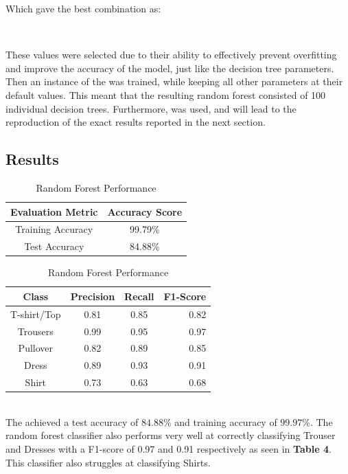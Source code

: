 Which gave the best combination as:\\

\begin{tcolorbox}[colback=white,
                  arc=0pt,
                outer=0pt]
\centering {} \, \,  \, \,  \, \, \\
   \end{tcolorbox}


These values were selected due to their ability to effectively prevent overfitting and improve the accuracy of the model, just like the decision tree parameters.
Then an instance of the  was trained, while keeping all other parameters at their default values.
This meant that the resulting random forest consisted of 100 individual decision trees.
Furthermore,  was used, and will lead to the reproduction of the exact results reported in the next section.

\subsection{Results}\label{subsec:results}
\begin{table}[!ht]
\begin{subtable}[c]{0.4\textwidth}
\footnotesize
\centering
\begin{tabular}{ c | c }
 \toprule
 Evaluation Metric & Accuracy Score  \\
 \midrule
 Training Accuracy &  99.79\% \\
 Test Accuracy & 84.88\% \\
 \bottomrule
\end{tabular}
\captionsetup{justification=centering,margin=1cm}
\end{subtable}
\begin{subtable}[c]{0.6\textwidth}
\footnotesize
\centering
\begin{tabular}{c | c c r}
Class & Precision & Recall & F1-Score\\
\midrule
T-shirt/Top   &    0.81  &    0.85  &    0.82 \\
Trousers   &    0.99  &    0.95  &    0.97 \\
Pullover   &    0.82  &    0.89  &    0.85\\
Dress   &    0.89  &    0.93  &    0.91\\
Shirt   &    0.73  &    0.63  &    0.68\\
\end{tabular}
\captionsetup{justification=centering,margin=1cm}
\end{subtable}
\caption{Random Forest Performance}
\label{tab:random_forest_evaluation}
\end{table}\\

The  achieved a test accuracy of $84.88\%$ and training accuracy of $99.97\%$.
The random forest classifier also performs very well at correctly classifying Trouser and Dresses with a F1-score of 0.97 and 0.91 respectively as seen in \textbf{Table 4}.
This classifier also struggles at classifying Shirts. \cite{handsonML}
